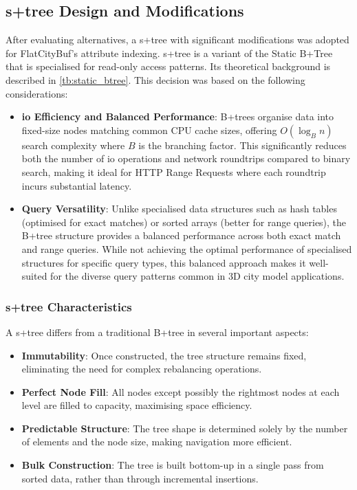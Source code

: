 \subsection{\texorpdfstring{\ac{s+tree}}{S+tree} Design and Modifications}
\label{methodology:attribute_index:static_btree_design}

After evaluating alternatives, a \ac{s+tree} with significant modifications was adopted for FlatCityBuf's attribute indexing. \ac{s+tree} is a variant of the Static B+Tree that is specialised for read-only access patterns. Its theoretical background is described in \autoref{tb:static_btree}. This decision was based on the following considerations:

\begin{itemize}
\item \textbf{\ac{io} Efficiency and Balanced Performance}: B+trees organise data into fixed-size nodes matching common CPU cache sizes, offering $O(\log_B n)$ search complexity where $B$ is the branching factor. This significantly reduces both the number of \ac{io} operations and network roundtrips compared to binary search, making it ideal for HTTP Range Requests where each roundtrip incurs substantial latency.

\item \textbf{Query Versatility}: Unlike specialised data structures such as hash tables (optimised for exact matches) or sorted arrays (better for range queries), the B+tree structure provides a balanced performance across both exact match and range queries. While not achieving the optimal performance of specialised structures for specific query types, this balanced approach makes it well-suited for the diverse query patterns common in 3D city model applications.
\end{itemize}

\subsubsection{\ac{s+tree} Characteristics}
\label{methodology:attribute_index:static_btree_characteristics}

A \ac{s+tree} differs from a traditional B+tree in several important aspects:

\begin{itemize}
\item \textbf{Immutability}: Once constructed, the tree structure remains fixed, eliminating the need for complex rebalancing operations.

\item \textbf{Perfect Node Fill}: All nodes except possibly the rightmost nodes at each level are filled to capacity, maximising space efficiency.

\item \textbf{Predictable Structure}: The tree shape is determined solely by the number of elements and the node size, making navigation more efficient.

\item \textbf{Bulk Construction}: The tree is built bottom-up in a single pass from sorted data, rather than through incremental insertions.
\end{itemize}

